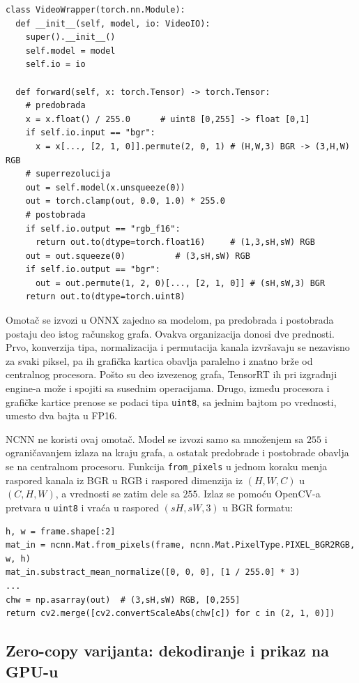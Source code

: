 \documentclass[12pt,a4paper]{article}
\begin{document}
\begin{verbatim}
class VideoWrapper(torch.nn.Module):
  def __init__(self, model, io: VideoIO):
    super().__init__()
    self.model = model
    self.io = io
    
  def forward(self, x: torch.Tensor) -> torch.Tensor:
    # predobrada
    x = x.float() / 255.0      # uint8 [0,255] -> float [0,1]
    if self.io.input == "bgr":
      x = x[..., [2, 1, 0]].permute(2, 0, 1) # (H,W,3) BGR -> (3,H,W) RGB
    # superrezolucija  
    out = self.model(x.unsqueeze(0))
    out = torch.clamp(out, 0.0, 1.0) * 255.0
    # postobrada
    if self.io.output == "rgb_f16":
      return out.to(dtype=torch.float16)     # (1,3,sH,sW) RGB
    out = out.squeeze(0)          # (3,sH,sW) RGB
    if self.io.output == "bgr":
      out = out.permute(1, 2, 0)[..., [2, 1, 0]] # (sH,sW,3) BGR
    return out.to(dtype=torch.uint8)
\end{verbatim}

Omotač se izvozi u ONNX zajedno sa modelom, pa predobrada i postobrada postaju deo istog računskog grafa. Ovakva organizacija donosi dve prednosti. Prvo, konverzija tipa, normalizacija i permutacija kanala izvršavaju se nezavisno za svaki piksel, pa ih grafička kartica obavlja paralelno i znatno brže od centralnog procesora. Pošto su deo izvezenog grafa, TensorRT ih pri izgradnji engine-a može i spojiti sa susednim operacijama. Drugo, između procesora i grafičke kartice prenose se podaci tipa \texttt{uint8}, sa jednim bajtom po vrednosti, umesto dva bajta u FP16.

NCNN ne koristi ovaj omotač. Model se izvozi samo sa množenjem sa $255$ i ograničavanjem izlaza na kraju grafa, a ostatak predobrade i postobrade obavlja se na centralnom procesoru. Funkcija \texttt{from\_pixels} u jednom koraku menja raspored kanala iz BGR u RGB i raspored dimenzija iz $(H,W,C)$ u $(C,H,W)$, a vrednosti se zatim dele sa $255$. Izlaz se pomoću OpenCV-a pretvara u \texttt{uint8} i vraća u raspored $(sH,sW,3)$ u BGR formatu:

\begin{verbatim}
h, w = frame.shape[:2]
mat_in = ncnn.Mat.from_pixels(frame, ncnn.Mat.PixelType.PIXEL_BGR2RGB, w, h)
mat_in.substract_mean_normalize([0, 0, 0], [1 / 255.0] * 3)
...
chw = np.asarray(out)  # (3,sH,sW) RGB, [0,255]
return cv2.merge([cv2.convertScaleAbs(chw[c]) for c in (2, 1, 0)])
\end{verbatim}


\subsection{Zero-copy varijanta: dekodiranje i prikaz na GPU-u}
\label{sec:zero_copy}
\end{document}
